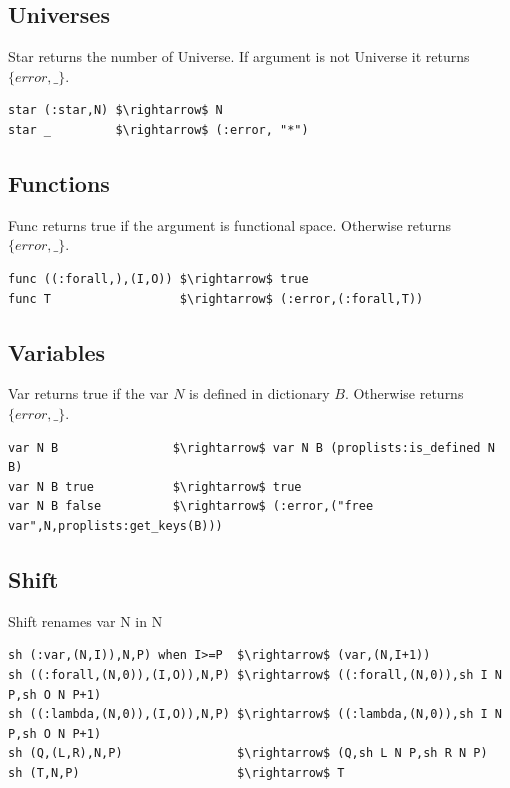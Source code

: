 \documentclass[11pt,oneside]{article}
\begin{document}
\subsection{Universes}
Star returns the number of Universe. If argument is not Universe it returns $\{error,\_\}$.

\begin{lstlisting}[mathescape=true]
star (:star,N) $\rightarrow$ N
star _         $\rightarrow$ (:error, "*")
\end{lstlisting}

\subsection{Functions}
Func returns true if the argument is functional space. Otherwise returns $\{error,\_\}$.

\begin{lstlisting}[mathescape=true]
func ((:forall,),(I,O)) $\rightarrow$ true
func T                  $\rightarrow$ (:error,(:forall,T))
\end{lstlisting}

\subsection{Variables}
Var returns true if the var $N$ is defined in dictionary $B$. Otherwise returns $\{error,\_\}$.

\begin{lstlisting}[mathescape=true]
var N B                $\rightarrow$ var N B (proplists:is_defined N B)
var N B true           $\rightarrow$ true
var N B false          $\rightarrow$ (:error,("free var",N,proplists:get_keys(B)))
\end{lstlisting}

\subsection{Shift}
Shift renames var N in N

\begin{lstlisting}[mathescape=true]
sh (:var,(N,I)),N,P) when I>=P  $\rightarrow$ (var,(N,I+1))
sh ((:forall,(N,0)),(I,O)),N,P) $\rightarrow$ ((:forall,(N,0)),sh I N P,sh O N P+1)
sh ((:lambda,(N,0)),(I,O)),N,P) $\rightarrow$ ((:lambda,(N,0)),sh I N P,sh O N P+1)
sh (Q,(L,R),N,P)                $\rightarrow$ (Q,sh L N P,sh R N P)
sh (T,N,P)                      $\rightarrow$ T
\end{lstlisting}
\end{document}
